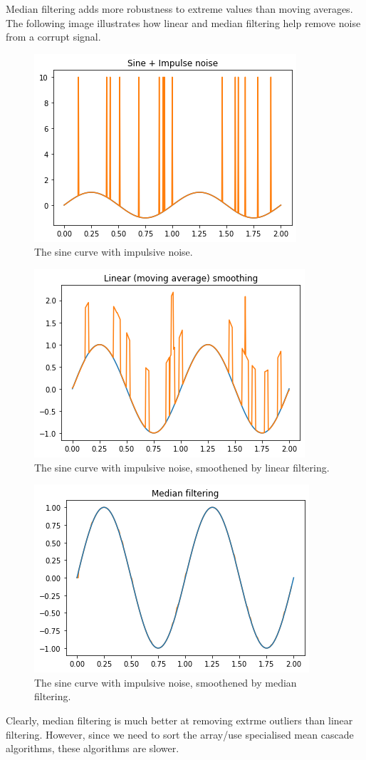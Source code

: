 \documentclass[a4paper, openany]{memoir}
\begin{document}
Median filtering adds more robustness to extreme values than moving averages. The following image illustrates how linear and median filtering help remove noise from a corrupt signal.
\begin{figure}[H]
    \centering
    \includegraphics[scale=0.5]{src/6.8 sine with noise.png}
    \caption{The sine curve with impulsive noise.}
\end{figure}
\begin{figure}[H]
    \centering
    \includegraphics[scale=0.5]{src/6.9 sine with noise (linear).png}
    \caption{The sine curve with impulsive noise, smoothened by linear filtering.}
\end{figure}
\begin{figure}[H]
    \centering
    \includegraphics[scale=0.5]{src/6.10 sine with noise (median).png}
    \caption{The sine curve with impulsive noise, smoothened by median filtering.}
\end{figure}
\noindent Clearly, median filtering is much better at removing extrme outliers than linear filtering. However, since we need to sort the array/use specialised mean cascade algorithms, these algorithms are slower.
\newpage
\end{document}
